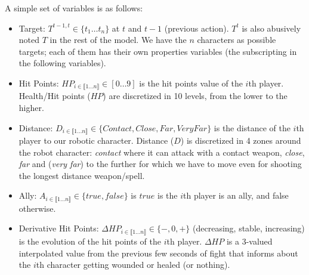 A simple set of variables is as follows: 
\begin{itemize}
    \item Target: $T^{t-1,t} \in \{t_1\dots t_n\}$ at $t$ and $t-1$ (previous action). $T^t$ is also abusively noted $T$ in the rest of the model. We have the $n$ characters as possible targets; each of them has their own properties variables (the subscripting in the following variables). 
    \item Hit Points: $HP_{i \in \llbracket 1\dots n\rrbracket} \in [0\dots 9]$ is the hit points value of the $i$th player. Health/Hit points ($HP$) are discretized in 10 levels, from the lower to the higher. 
    \item Distance: $D_{i \in \llbracket 1 \dots n \rrbracket} \in \{Contact, Close, Far, VeryFar\}$ is the distance of the $i$th player to our robotic character. Distance ($D$) is discretized in 4 zones around the robot character: \textit{contact} where it can attack with a contact weapon, \textit{close}, \textit{far} and (\textit{very far}) to the further for which we have to move even for shooting the longest distance weapon/spell. 
    \item Ally: $A_{i \in \llbracket 1 \dots n \rrbracket} \in \{true, false\}$ is $true$ is the $i$th player is an ally, and false otherwise.
    \item Derivative Hit Points: $\Delta HP_{i \in \llbracket 1 \dots n \rrbracket} \in \{-, 0, +\}$ (decreasing, stable, increasing) is the evolution of the hit points of the $i$th player. $\Delta HP$ is a 3-valued interpolated value from the previous few seconds of fight that informs about the $i$th character getting wounded or healed (or nothing). 

\end{itemize}
